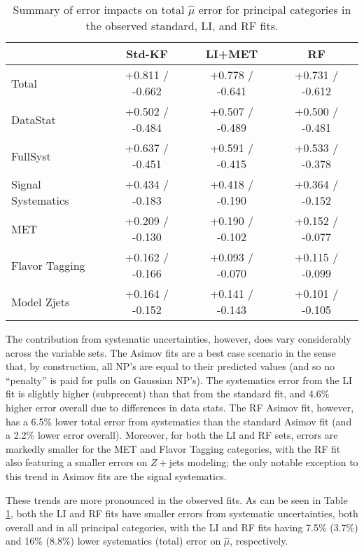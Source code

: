 \begin{table}[!htbp]\captionsetup{justification=centering}
\begin{center}
\begin{tabular}{lccc}
\hline\hline
 &Std-KF &LI+MET &RF\\
\hline
Total &  +0.811 / -0.662  &  +0.778 / -0.641  &  +0.731 / -0.612 \\
\hline
DataStat &  +0.502 / -0.484  &  +0.507 / -0.489  &  +0.500 / -0.481 \\
\hline
FullSyst &  +0.637 / -0.451  &  +0.591 / -0.415  &  +0.533 / -0.378 \\
\hline
Signal Systematics &  +0.434 / -0.183  &  +0.418 / -0.190  &  +0.364 / -0.152 \\
\hline
MET &  +0.209 / -0.130  &  +0.190 / -0.102  &  +0.152 / -0.077 \\
\hline
Flavor Tagging &  +0.162 / -0.166  &  +0.093 / -0.070  &  +0.115 / -0.099 \\
\hline
Model Zjets &  +0.164 / -0.152  &  +0.141 / -0.143  &  +0.101 / -0.105 \\
\hline
\end{tabular}
\caption{Summary of error impacts on total $\hat{\mu}$ error for principal categories in the observed standard, LI, and RF fits.}
\label{tab:bd-obs-summary}
\end{center}
\end{table}


The contribution from systematic uncertainties, however, does vary considerably across the variable sets.  The Asimov fits are a best case scenario in the sense that, by construction, all NP's are equal to their predicted values (and so no ``penalty'' is paid for pulls on Gaussian NP's).  The systematics error from the LI fit is slightly higher (subprecent) than that from the standard fit, and 4.6\% higher error overall due to differences in data stats.  The RF Asimov fit, however, has a 6.5\% lower total error from systematics than the standard Asimov fit (and a 2.2\% lower error overall).  Moreover, for both the LI and RF sets, errors are markedly smaller for the MET and Flavor Tagging categories, with the RF fit also featuring a smaller errors on $Z+$jets modeling; the only notable exception to this trend in Asimov fits are the signal systematics.

These trends are more pronounced in the observed fits.  As can be seen in Table \ref{tab:bd-obs-summary}, both the LI and RF fits have smaller errors from systematic uncertainties, both overall and in all principal categories, with the LI and RF fits having 7.5\% (3.7\%) and 16\% (8.8\%) lower systematics (total) error on $\hat{\mu}$, respectively.

